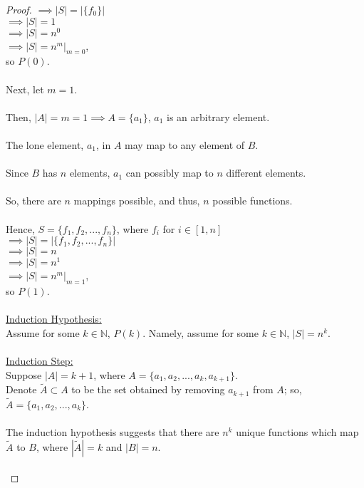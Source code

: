 \documentclass[12pt]{article}
\begin{document}
\begin{proof}
    $\implies |S| = |\{f_0\}|$ \\
    $\implies |S| = 1$ \\
    $\implies |S| = n^0$ \\
    $\implies |S| = n^m|_{m = 0}$, \\
    so $P(0)$. \\
    \\
    Next, let $m = 1$. \\
    \\
    Then, $|A| = m = 1 \implies A = \{a_1\}$, $a_1$ is an arbitrary element. \\
    \\
    The lone element, $a_1$, in $A$ may map to any element of $B$. \\
    \\
    Since $B$ has $n$ elements, $a_1$ can possibly map to $n$ different elements. \\
    \\
    So, there are $n$ mappings possible, and thus, $n$ possible functions. \\
    \\
    Hence, $S = \{f_1, f_2, ..., f_n\}$, where $f_i$ for $i \in [1, n]$ \\
    $\implies |S| = |\{f_1, f_2, ..., f_n\}|$ \\
    $\implies |S| = n$ \\
    $\implies |S| = n^1$ \\
    $\implies |S| = n^m|_{m = 1}$, \\
    so $P(1)$. \\
    \\
    \underline{Induction Hypothesis:} \\
    Assume for some $k \in \mathbb{N}$, $P(k)$. Namely, assume for some $k \in \mathbb{N}$, $|S| = n^k$. \\
    \\
    \underline{Induction Step:} \\
    Suppose $|A| = k + 1$, where $A = \{a_1, a_2, ..., a_k, a_{k+1}\}$. \\
    Denote $\widetilde{A} \subset A$ to be the set obtained by removing $a_{k+1}$ from $A$; so, $\widetilde{A} = \{a_1, a_2, ..., a_k\}$. \\
    \\
    The induction hypothesis suggests that there are $n^k$ unique functions which map $\widetilde{A}$ to $B$, where $|\widetilde{A}| = k$ and $|B| = n$. \\
    \\

\end{proof}
\end{document}
